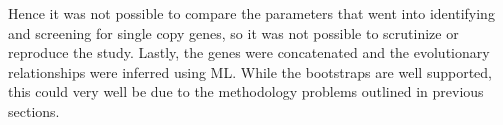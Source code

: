 \documentclass[12pt]{article}
\begin{document}
Hence it was not possible to compare the parameters that went into identifying and screening for single copy genes, so it was not possible to scrutinize or reproduce the study.
Lastly, the genes were concatenated and the evolutionary relationships were inferred using ML. 
While the bootstraps are well supported, this could very well be due to the methodology problems outlined in previous sections.
\end{document}
